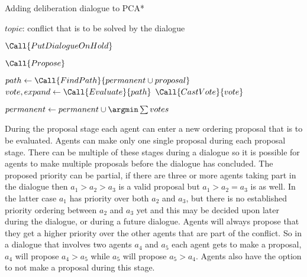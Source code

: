 \begin{algorithm}[t]
    \caption{Adding deliberation dialogue to PCA*}
    \label{alg:dpca}
    \begin{algorithmic}[1]
        \Require $topic$: conflict that is to be solved by the dialogue
        
        
        \State $\Call{PutDialogueOnHold}$
        \EndIf
        
        
        \Repeat
        \State $\Call{Propose}$
        
        
        \State $path \gets \Call{FindPath}{permanent \cup proposal}$
        \State $vote, expand \gets \Call{Evaluate}{path}$
        \State $\Call{CastVote}{vote}$
        \EndFor
        
        
        \State $permanent \gets permanent \cup {\argmin \sum votes}$
    \end{algorithmic}
\end{algorithm}

During the proposal stage each agent can enter a new ordering proposal that is
to be evaluated. Agents can make only one single proposal during each proposal
stage. There can be multiple of these stages during a dialogue so it is
possible for agents to make multiple proposals before the dialogue has
concluded. The proposed priority can be
partial, if there are three or more agents taking part in the dialogue then
$a_1 > a_2 > a_3$ is a valid proposal but $a_1 > a_2 = a_3$ is as well. In the
latter case $a_1$ has priority over both $a_2$ and $a_3$, but there is no
established priority ordering between $a_2$ and $a_3$ yet and this may be
decided upon later during the dialogue, or during a future dialogue. Agents
will always propose that they get a higher priority over the other agents that
are part of the conflict. So in a dialogue that involves two agents $a_4$ and
$a_5$ each agent gets to make a proposal, $a_4$ will propose $a_4 > a_5$ while
$a_5$ will propose $a_5 > a_4$. Agents also have the option to not make a 
proposal during this stage.

